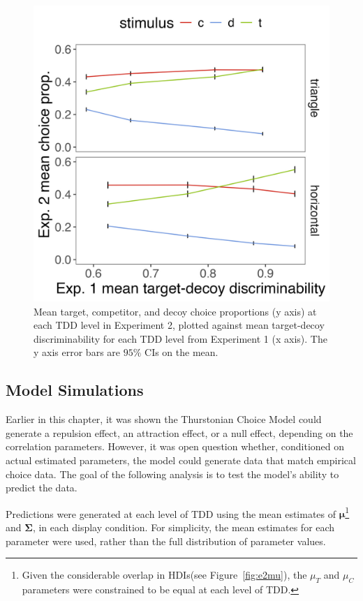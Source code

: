 \begin{figure}
   \includegraphics[width=\textwidth]{figures/choicePhase_att_trials_compare_to_2afc_collapsed.jpeg}
   \caption{Mean target, competitor, and decoy choice proportions (y axis) at each TDD level in Experiment 2, plotted against mean target-decoy discriminability for each TDD level from Experiment 1 (x axis). The y axis error bars are $95\%$ CIs on the mean.}
   \label{fig:e2_choice_compare_to_2afc}
\end{figure}

\subsection{Model Simulations}
Earlier in this chapter, it was shown the Thurstonian Choice Model could generate a repulsion effect, an attraction effect, or a null effect, depending on the correlation parameters. However, it was open question whether, conditioned on actual estimated parameters, the model could generate data that match empirical choice data. The goal of the following analysis is to test the model's ability to predict the data. 

Predictions were generated at each level of TDD using the mean estimates of $\boldsymbol{\mu}$\footnote{Given the considerable overlap in HDIs(see Figure~\ref{fig:e2mu}), the $\mu_{T}$ and $\mu_{C}$ parameters were constrained to be equal at each level of TDD. } and $\boldsymbol{\Sigma}$, in each display condition. For simplicity, the mean estimates for each parameter were used, rather than the full distribution of parameter values.

